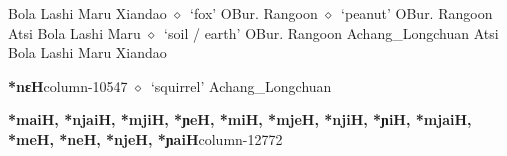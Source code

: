          Bola 
\hspace{1ex}
         Lashi 
\hspace{1ex}
         Maru 
\hspace{1ex}
         Xiandao 
\hspace{1ex}
         $\diamond$~`fox'
         OBur. 
\hspace{1ex}
         Rangoon 
\hspace{1ex}
         $\diamond$~`peanut'
         OBur. 
\hspace{1ex}
         Rangoon 
\hspace{1ex}
         Atsi 
\hspace{1ex}
         Bola 
\hspace{1ex}
         Lashi 
\hspace{1ex}
         Maru 
\hspace{1ex}
         $\diamond$~`soil / earth'
         OBur. 
\hspace{1ex}
         Rangoon 
\hspace{1ex}
         Achang\_Longchuan 
\hspace{1ex}
         Atsi 
\hspace{1ex}
         Bola 
\hspace{1ex}
         Lashi 
\hspace{1ex}
         Maru 
\hspace{1ex}
         Xiandao 
  \item {\footnotesize \textbf{*nɛH}}{\tiny column-10547}
         $\diamond$~`squirrel'
         Achang\_Longchuan 
  \item {\footnotesize \textbf{*maiH, *njaiH, *mjiH, *ɲeH, *miH, *mjeH, *njiH, *ɲiH, *mjaiH, *meH, *neH, *njeH, *ɲaiH}}{\tiny column-12772}
